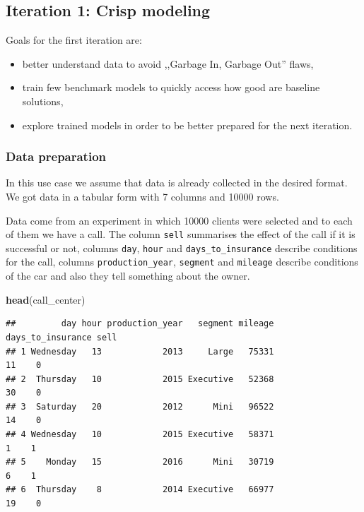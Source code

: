 \documentclass[12pt,]{krantz}
\newenvironment{Shaded}{\begin{snugshade}}{\end{snugshade}}
\newcommand{\KeywordTok}[1]{\textcolor[rgb]{0.13,0.29,0.53}{\textbf{#1}}}
\newcommand{\NormalTok}[1]{#1}
\providecommand{\tightlist}{%
  \setlength{\itemsep}{0pt}\setlength{\parskip}{0pt}}
\begin{document}
\hypertarget{iteration-1-crisp-modeling}{%
\subsection{Iteration 1: Crisp modeling}\label{iteration-1-crisp-modeling}}

Goals for the first iteration are:

\begin{itemize}
\tightlist
\item
  better understand data to avoid ,,Garbage In, Garbage Out'' flaws,
\item
  train few benchmark models to quickly access how good are baseline solutions,
\item
  explore trained models in order to be better prepared for the next iteration.
\end{itemize}

\hypertarget{data-preparation-2}{%
\subsubsection{Data preparation}\label{data-preparation-2}}

In this use case we assume that data is already collected in the desired format.
We got data in a tabular form with 7 columns and 10000 rows.

Data come from an experiment in which 10000 clients were selected and to each of them we have a call. The column \texttt{sell} summarises the effect of the call if it is successful or not, columns \texttt{day}, \texttt{hour} and \texttt{days\_to\_insurance} describe conditions for the call, columns \texttt{production\_year}, \texttt{segment} and \texttt{mileage} describe conditions of the car and also they tell something about the owner.

\begin{Shaded}
\begin{Highlighting}[]
\KeywordTok{head}\NormalTok{(call_center)}
\end{Highlighting}
\end{Shaded}

\begin{verbatim}
##         day hour production_year   segment mileage days_to_insurance sell
## 1 Wednesday   13            2013     Large   75331                11    0
## 2  Thursday   10            2015 Executive   52368                30    0
## 3  Saturday   20            2012      Mini   96522                14    0
## 4 Wednesday   10            2015 Executive   58371                 1    1
## 5    Monday   15            2016      Mini   30719                 6    1
## 6  Thursday    8            2014 Executive   66977                19    0
\end{verbatim}
\end{document}

